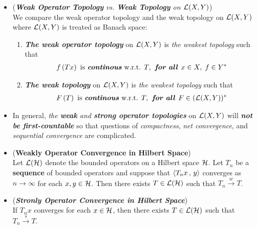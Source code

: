 \documentclass[11pt]{article}
\begin{document}
\begin{itemize}
\item \begin{remark} (\emph{\textbf{Weak Operator Topology} vs. \textbf{Weak Topology} on ${\mathcal L}(X, Y)$})\\
We compare the weak operator topology and the weak topology on ${\mathcal L}(X, Y)$ where ${\mathcal L}(X, Y)$ is treated as Banach space:
\begin{enumerate}
\item \emph{\textbf{The weak operator topology}} on  ${\mathcal L}(X, Y)$ is \emph{the weakest topology} such that 
\begin{align*}
f\left(Tx\right) \text{ is \emph{\textbf{continous}} w.r.t. }T,\text{\emph{\textbf{ for all }}}x\in X, \; f \in Y^{*}
\end{align*}

\item \emph{\textbf{The weak topology}} on  ${\mathcal L}(X, Y)$ is \emph{the weakest topology} such that 
\begin{align*}
F\left(T\right) \text{ is \emph{\textbf{continous}} w.r.t. }T,\text{\emph{\textbf{ for all }}}F \in ({\mathcal L}(X, Y))^{*}
\end{align*}
\end{enumerate}
\end{remark}

\item \begin{remark}
In general, \emph{the \textbf{weak} and \textbf{strong operator topologies}} on ${\mathcal L}(X, Y)$ will \emph{\textbf{not be first-countable}} 
so that questions of \emph{compactness}, \emph{net convergence}, and \emph{sequential convergence} are complicated. 
\end{remark}

\item \begin{proposition} (\textbf{Weakly Operator Convergence in Hilbert Space}) \citep{reed1980methods}\\
Let ${\mathcal L}({\mathcal H})$ denote the bounded operators on a Hilbert space ${\mathcal H}$. Let $T_n$ be a \textbf{sequence} of bounded operators and suppose that 
$\left\langle T_n x\,,\, y \right\rangle$ converges as $n \rightarrow \infty$ for each $x, y \in  {\mathcal H}$. Then there exists $T \in {\mathcal L}({\mathcal H})$
such that $T_{n} \stackrel{w}{\rightarrow} T $. 
\end{proposition}

\item \begin{remark} (\textbf{\emph{Stronly Operator Convergence in Hilbert Space}}) \citep{reed1980methods}\\
If $T_n x$ converges for each $x \in {\mathcal H}$, then there exists $T \in {\mathcal L}({\mathcal H})$
such that $T_{n} \stackrel{s}{\rightarrow} T $. 
\end{remark}


\end{itemize}
\end{document}
